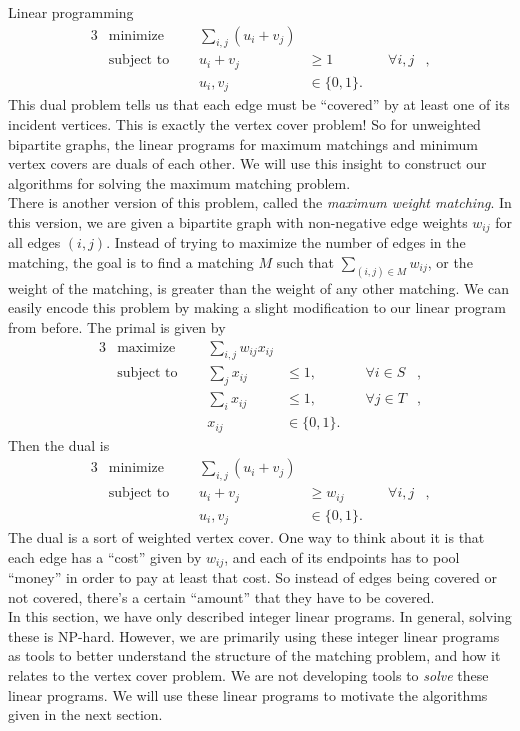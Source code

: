 \documentclass[11pt]{article}
\renewcommand{\'}{^{'}}
\begin{document}
\begin{section}{Linear programming}
	\begin{alignat}{3}
		& \text{minimize } & \sum_{i,j} (u_i + v_j)& \\
		& \text{subject to } \quad & u_i + v_j & \geq 1 & \quad \forall i,j &, \\
				    && u_i,v_j & \in \{0,1\}.
	\end{alignat}
	This dual problem tells us that each edge must be ``covered'' by at least one of its incident 
	vertices. This is exactly the vertex cover problem! So for unweighted bipartite graphs, the 
	linear programs for maximum matchings and minimum vertex covers are duals of each other. 
	We will use this insight to construct our algorithms for solving the maximum matching problem. 
	\\
	There is another version of this problem, called the \emph{maximum weight matching}. In this 
	version, we are given a bipartite graph with non-negative edge weights $w_{ij}$ for all 
	edges $(i,j)$. Instead of trying to maximize the number of edges in the matching, the goal 
	is to find a matching $M$ such that $\sum_{(i,j) \in M} w_{ij}$, or the weight of the matching, 
	is greater than the weight of any other matching. We can easily encode this problem by making 
	a slight modification to our linear program from before. The primal is given by
	\begin{alignat}{3}
		& \text{maximize } & \sum_{i,j} w_{ij}x_{ij}& \\
		& \text{subject to } \quad & \sum_{j} x_{ij} & \leq 1, & \quad \forall i\in S&, \\
				     &\quad & \sum_{i} x_{ij} & \leq 1, & \quad \forall j\in T &, \\
				&& x_{ij} & \in \{0,1\}.
	\end{alignat}
	Then the dual is
	\begin{alignat}{3}
		& \text{minimize } & \sum_{i,j} (u_i + v_j)& \\
		& \text{subject to } \quad & u_i + v_j & \geq w_{ij} & \quad \forall i,j &, \\
				    && u_i,v_j & \in \{0,1\}.
	\end{alignat}
	The dual is a sort of weighted vertex cover. One way to think about it is that each edge 
	has a ``cost'' given by $w_{ij}$, and each of its endpoints has to pool ``money'' in order 
	to pay at least that cost. So instead of edges being covered or not covered, there's a certain 
	``amount'' that they have to be covered.\\
	In this section, we have only described integer linear programs. In general, solving these 
	is NP-hard. However, we are primarily using these integer linear programs as tools to better 
	understand the structure of the matching problem, and how it relates to the vertex cover 
	problem. We are not developing tools to \emph{solve} these linear programs.
	We will use these linear programs to motivate the algorithms given in the next section. 
\end{section}
\end{document}
